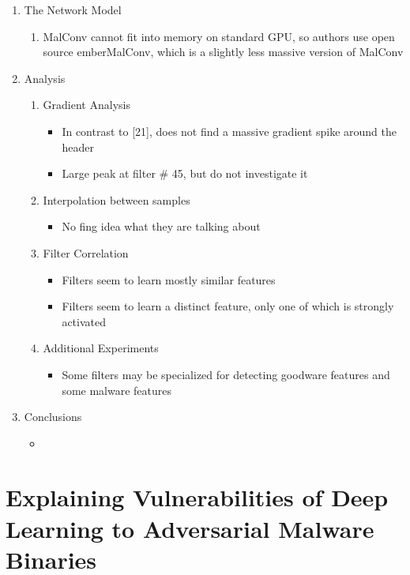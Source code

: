 \documentclass{article}
\begin{document}
\begin{enumerate}
\begin{enumerate}
	\end{enumerate}
	\item The Network Model
	\begin{enumerate}
		\item MalConv cannot fit into memory on standard GPU, so authors use open source emberMalConv, which is a slightly less massive version of MalConv
	\end{enumerate}
	\item Analysis
	\begin{enumerate}
		\item Gradient Analysis
		\begin{itemize}
			\item In contrast to [21], does not find a massive gradient spike around the header
			\item Large peak at filter \# 45, but do not investigate it
		\end{itemize}
		\item Interpolation between samples
		\begin{itemize}
			\item No fing idea what they are talking about
		\end{itemize}
		\item Filter Correlation
		\begin{itemize}
			\item Filters seem to learn mostly similar features
			\item Filters seem to learn a distinct feature, only one of which is strongly activated
		\end{itemize}
		\item Additional Experiments
		\begin{itemize}
			\item Some filters may be specialized for detecting goodware features and some malware features
		\end{itemize}
	\end{enumerate}
	\item Conclusions
	\begin{itemize}
		\item 
	\end{itemize}
\end{enumerate}

\pagebreak


\section*{Explaining Vulnerabilities of Deep Learning to Adversarial Malware Binaries}
\end{document}
